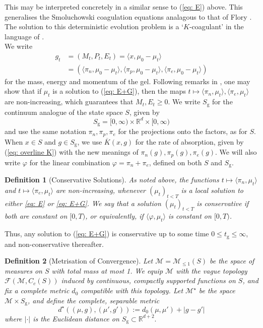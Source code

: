 \documentclass[11pt, notitlepage]{article}
\newtheorem{defn}{Definition}[section]
\begin{document}
This may be interpreted concretely in a similar sense to  (\ref{eq: E}) above.
This generalises the Smoluchowski coagulation equations \cite{vS16} analagous to that of Flory \cite{ZS80}.
The solution to this deterministic evolution problem is a `$K$-coagulant' in the language of \cite{N00}. \medskip \\ We write \begin{equation}\label{eq: gel data} \begin{split}
   g_t&= (M_t, P_t, E_t)=\langle x, \mu_0-\mu_t\rangle \\ &= \left(\langle \pi_n, \mu_0-\mu_t\rangle,\langle \pi_p, \mu_0-\mu_t\rangle,\langle \pi_e, \mu_0-\mu_t\rangle\right) \end{split}
\end{equation} for the mass, energy and momentum of the gel. Following remarks in \cite{N00}, one may show that if $\mu_t$ is a solution to (\ref{eq: E+G}), then the maps $t\mapsto \langle \pi_n, \mu_t\rangle, \langle \pi_e, \mu_t\rangle$ are non-increasing, which guarantees that $M_t, E_t\ge 0$. We write  $S_\mathrm{g}$ for the continuum analogue of the state space $S$, given by \begin{equation}
    S_\mathrm{g}=[0,\infty)\times \mathbb{R}^d\times [0,\infty)
\end{equation} and use the same notation $\pi_n, \pi_p, \pi_e$ for the projections onto the factors, as for $S$. When $x\in S$ and $g\in S_\mathrm{g}$, we use $\overline{K}(x,g)$ for the rate of absorption, given by (\ref{eq: overline K}) with the new meanings of $\pi_n(g), \pi_p(g),\pi_e(g).$ We will also write $\varphi$ for the linear combination $\varphi=\pi_n+\pi_e$, defined on both $S$ and $ S_\mathrm{g}$.

\begin{defn}[Conservative Solutions] As noted above, the functions $t\mapsto \langle \pi_n, \mu_t\rangle$ and $t\mapsto \langle \pi_e, \mu_t\rangle$ are non-increasing, whenever $(\mu_t)_{t<T}$ is a local solution to either \eqref{eq: E} or \eqref{eq: E+G}. We say that a solution $(\mu_t)_{t<T}$ is \emph{conservative} if both are constant on $[0,T)$, or equivalently, if $\langle \varphi, \mu_t\rangle$ is constant on $[0,T)$. \end{defn}
 Thus, any solution to (\ref{eq: E+G}) is conservative up to some time $0\le t_\mathrm{g}\leq \infty$, and non-conservative thereafter.
 
\begin{defn}[Metrisation of Convergence] Let $\mathcal{M}=\mathcal{M}_{\le 1}(S)$ be the space of measures on $S$ with total mass at most 1. We equip $\mathcal{M}$ with the \emph{vague} topology $\mathcal{F}(\mathcal{M}, C_c(S))$ induced by continuous, compactly supported functions on $S$, and fix a complete metric $d_0$ compatible with this topology. Let $\mathcal{M}^\star$ be the space $\mathcal{M}\times S_\mathrm{g}$, and define the complete, separable metric \begin{equation} d^\star\left((\mu, g), (\mu', g')\right):=d_0(\mu, \mu')+|g-g'| \end{equation} where $|\cdot|$ is the Euclidean distance on $S_\mathrm{g}\subset \mathbb{R}^{d+2}.$ \end{defn}
\end{document}
